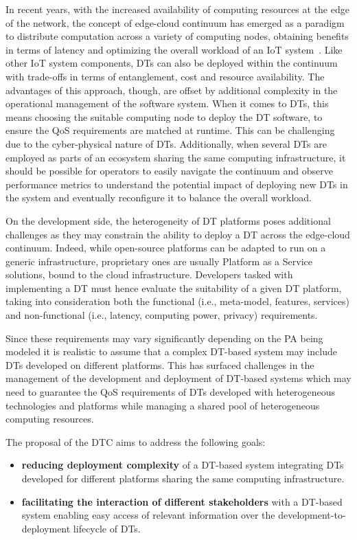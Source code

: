 In recent years, with the increased availability of computing resources at the edge of the network, the concept of edge-cloud continuum has emerged as a paradigm to distribute computation across a variety of computing nodes, obtaining benefits in terms of latency and optimizing the overall workload of an \ac{IoT} system~\cite{Rosendo_Costan_Valduriez_Antoniu_2022}.
%
Like other \ac{IoT} system components, \acp{DT} can also be deployed within the continuum~\cite{Bellavista_Bicocchi_Fogli_Giannelli_Mamei_Picone_2024} with trade-offs in terms of entanglement, cost and resource availability.
%
The advantages of this approach, though, are offset by additional complexity in the operational management of the software system.
When it comes to \acp{DT}, this means choosing the suitable computing node to deploy the \ac{DT} software, to ensure the \ac{QoS} requirements are matched at runtime.
This can be challenging due to the cyber-physical nature of \acp{DT}.
Additionally, when several \acp{DT} are employed as parts of an ecosystem sharing the same computing infrastructure, it should be possible for operators to easily navigate the continuum and observe performance metrics to understand the potential impact of deploying new \acp{DT} in the system and eventually reconfigure it to balance the overall workload.

On the development side, the heterogeneity of \ac{DT} platforms poses additional challenges as they may constrain the ability to deploy a \ac{DT} across the edge-cloud continuum.
%
Indeed, while open-source platforms can be adapted to run on a generic infrastructure, proprietary ones are usually Platform as a Service solutions, bound to the cloud infrastructure. 
%
Developers tasked with implementing a \ac{DT} must hence evaluate the suitability of a given \ac{DT} platform, taking into consideration both the functional (i.e., meta-model, features, services) and non-functional (i.e., latency, computing power, privacy) requirements.

Since these requirements may vary significantly depending on the \ac{PA} being modeled it is realistic to assume that a complex \ac{DT}-based system may include \acp{DT} developed on different platforms.
%
This has surfaced challenges in the management of the development and deployment of \ac{DT}-based systems which may need to guarantee the \ac{QoS} requirements of \acp{DT} developed with heterogeneous technologies and platforms while managing a shared pool of heterogeneous computing resources.

The proposal of the \ac{DTC} aims to address the following goals:
\begin{itemize}
    \item \textbf{reducing deployment complexity} of a \ac{DT}-based system integrating \acp{DT} developed for different platforms sharing the same computing infrastructure.
    \item \textbf{facilitating the interaction of different stakeholders} with a \ac{DT}-based system enabling easy access of relevant information over the development-to-deployment lifecycle of \acp{DT}.
\end{itemize}

